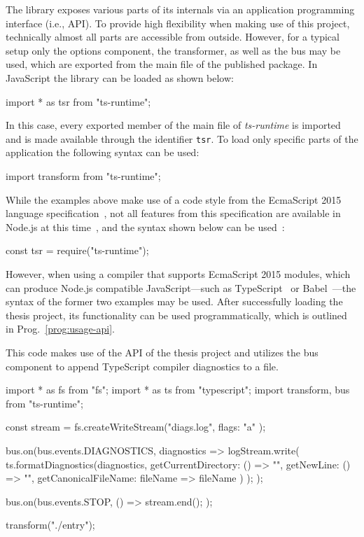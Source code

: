 The library exposes various parts of its internals via an application programming interface (i.e., API). To provide high flexibility when making use of this project, technically almost all parts are accessible from outside. However, for a typical setup only the options component, the transformer, as well as the bus may be used, which are exported from the main file of the published package. In JavaScript the library can be loaded as shown below:
\begin{JsCode}[numbers=none]
import * as tsr from "ts-runtime";
\end{JsCode}
In this case, every exported member of the main file of \emph{ts-runtime} is imported and is made available through the identifier \texttt{tsr}. To load only specific parts of the application the following syntax can be used:
\begin{JsCode}[numbers=none]
import { transform } from "ts-runtime";
\end{JsCode}
While the examples above make use of a code style from the EcmaScript 2015 language specification~\cite[p.~302]{ES6Spec:Ecma:2015}, not all features from this specification are available in Node.js at this time~\cite{Node:Docs:ES6}, and the syntax shown below can be used~\cite{Node:API:Modules}:
\begin{JsCode}[numbers=none]
const tsr = require("ts-runtime");
\end{JsCode}
However, when using a compiler that supports EcmaScript 2015 modules, which can produce Node.js compatible JavaScript---such as TypeScript~\cite{TypeScriptHandbook:Modules} or Babel~\cite{Babel:Plugins}---the syntax of the former two examples may be used. After successfully loading the thesis project, its functionality can be used programmatically, which is outlined in Prog.~\ref{prog:usage-api}.
\begin{program}
\caption{This code makes use of the API of the thesis project and utilizes the bus component to append TypeScript compiler diagnostics to a file.}
\label{prog:usage-api}
\begin{JsCode}
import * as fs from "fs";
import * as ts from "typescript";
import { transform, bus } from "ts-runtime";

const stream = fs.createWriteStream("diags.log", { flags: "a" });

bus.on(bus.events.DIAGNOSTICS, diagnostics => {
  logStream.write(
    ts.formatDiagnostics(diagnostics, {
      getCurrentDirectory: () => "",
      getNewLine: () => "\n",
      getCanonicalFileName: fileName => fileName
    })
  );
});

bus.on(bus.events.STOP, () => {
  stream.end();
});

transform("./entry");
\end{JsCode}
\end{program}

